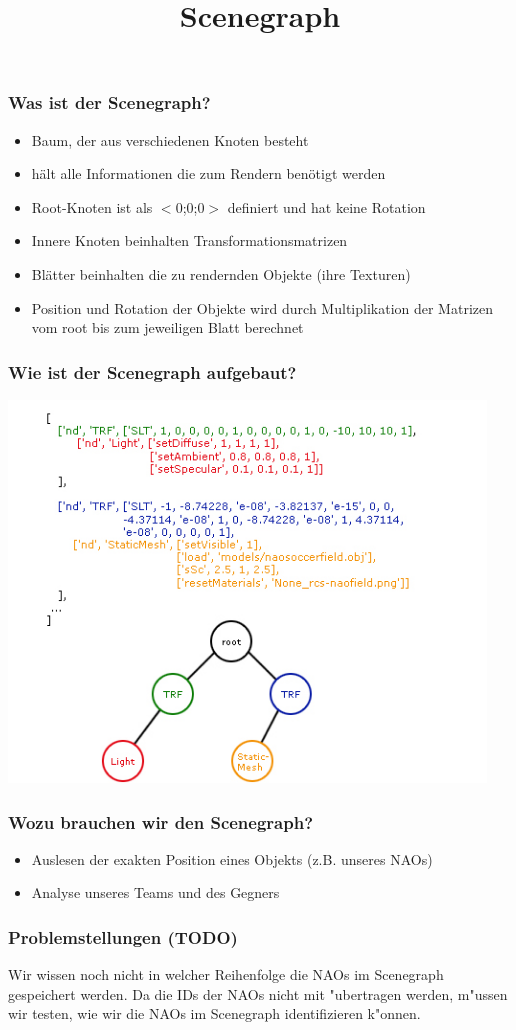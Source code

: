 \documentclass{beamer}
\title{Scenegraph}
\begin{document}
\maketitle
 

\begin{frame} %
  \frametitle{Was ist der Scenegraph?} %
	  \begin{itemize}
	  \item Baum, der aus verschiedenen Knoten besteht
	  \item hält alle Informationen die zum Rendern benötigt werden
	  \item Root-Knoten ist als $<$0;0;0$>$ definiert und hat keine Rotation
	  \item Innere Knoten beinhalten Transformationsmatrizen
	  \item Blätter beinhalten die zu rendernden Objekte (ihre Texturen)
	  \item Position und Rotation der Objekte wird durch Multiplikation der Matrizen vom root bis zum jeweiligen Blatt berechnet
	\end{itemize}

\end{frame}
\begin{frame} %
  \frametitle{Wie ist der Scenegraph aufgebaut?} %
\includegraphics[width=0.95\textwidth]{Scene}
\end{frame}
\begin{frame} %
  \frametitle{Wozu brauchen wir den Scenegraph?} %
  	 \begin{itemize}
	  \item Auslesen der exakten Position eines Objekts (z.B. unseres NAOs)
	  \item Analyse unseres Teams und des Gegners
	\end{itemize}

\end{frame}
\begin{frame} %
  \frametitle{Problemstellungen (TODO)} %
	 Wir wissen noch nicht in welcher Reihenfolge die NAOs im Scenegraph gespeichert werden. Da die IDs der NAOs nicht mit "ubertragen werden, m"ussen wir testen, wie wir die NAOs im Scenegraph identifizieren k"onnen.
\end{frame}
\end{document}
